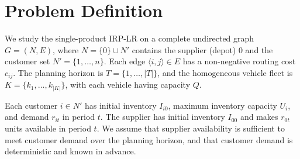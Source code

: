 \documentclass{article}
\begin{document}
\section{Problem Definition}
\label{sec:problem_definition}

We study the single-product IRP-LR on a complete undirected graph
$G=(N,E)$, where $N=\{0\}\cup N'$ contains the supplier (depot) $0$ and the
customer set $N'=\{1,\ldots,n\}$. Each edge $\langle i,j\rangle\in E$ has
a non-negative routing cost $c_{ij}$. The planning horizon is
$T=\{1,\ldots,|T|\}$, and the homogeneous vehicle fleet is
$K=\{k_1,\ldots,k_{|K|}\}$, with each vehicle having capacity $Q$.

Each customer $i\in N'$ has initial inventory $I_{i0}$, maximum inventory
capacity $U_i$, and demand $r_{it}$ in period $t$. The supplier has initial
inventory $I_{00}$ and makes $r_{0t}$ units available in period $t$. We
assume that supplier availability is sufficient to meet customer demand
over the planning horizon, and that customer demand is deterministic and
known in advance.
\end{document}

